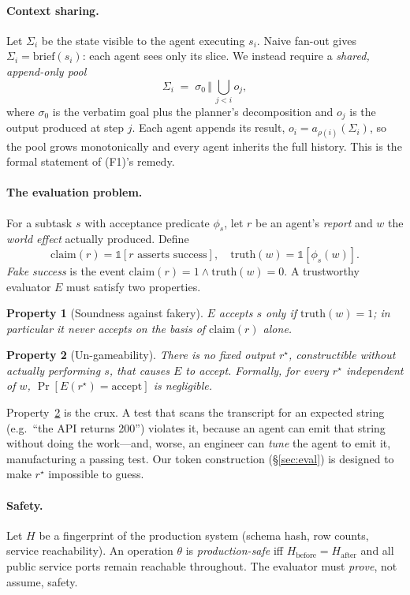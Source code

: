 \documentclass[10pt,twocolumn]{article}
\newtheorem{property}{Property}
\begin{document}
\paragraph{Context sharing.}
Let $\Sigma_i$ be the state visible to the agent executing $s_i$. Naive
fan-out gives $\Sigma_i = \mathrm{brief}(s_i)$: each agent sees only its slice.
We instead require a \emph{shared, append-only pool}
\[
\Sigma_i \;=\; \sigma_0 \,\Vert\, \bigcup_{j<i} o_j,
\]
where $\sigma_0$ is the verbatim goal plus the planner's decomposition and
$o_j$ is the output produced at step $j$. Each agent appends its result,
$o_i = a_{\rho(i)}(\Sigma_i)$, so the pool grows monotonically and every agent
inherits the full history. This is the formal statement of (F1)'s remedy.

\paragraph{The evaluation problem.}
For a subtask $s$ with acceptance predicate $\phi_s$, let $r$ be an agent's
\emph{report} and $w$ the \emph{world effect} actually produced. Define
\[
\mathrm{claim}(r) = \mathbb{1}[r \text{ asserts success}], \quad
\mathrm{truth}(w) = \mathbb{1}[\phi_s(w)].
\]
\emph{Fake success} is the event
$\mathrm{claim}(r)=1 \wedge \mathrm{truth}(w)=0$. A trustworthy evaluator $E$
must satisfy two properties.

\begin{property}[Soundness against fakery]\label{prop:sound}
$E$ accepts $s$ only if $\mathrm{truth}(w)=1$; in particular it never accepts on
the basis of $\mathrm{claim}(r)$ alone.
\end{property}

\begin{property}[Un-gameability]\label{prop:ungame}
There is no fixed output $r^\star$, constructible without actually performing
$s$, that causes $E$ to accept. Formally, for every $r^\star$ independent of
$w$, $\Pr[E(r^\star)=\text{accept}]$ is negligible.
\end{property}

Property~\ref{prop:ungame} is the crux. A test that scans the transcript for an
expected string (e.g.\ ``the API returns 200'') violates it, because an agent
can emit that string without doing the work---and, worse, an engineer can
\emph{tune} the agent to emit it, manufacturing a passing test. Our token
construction (\S\ref{sec:eval}) is designed to make $r^\star$ impossible to
guess.

\paragraph{Safety.}
Let $H$ be a fingerprint of the production system (schema hash, row counts,
service reachability). An operation $\theta$ is \emph{production-safe} iff
$H_{\text{before}} = H_{\text{after}}$ and all public service ports remain
reachable throughout. The evaluator must \emph{prove}, not assume, safety.
\end{document}

